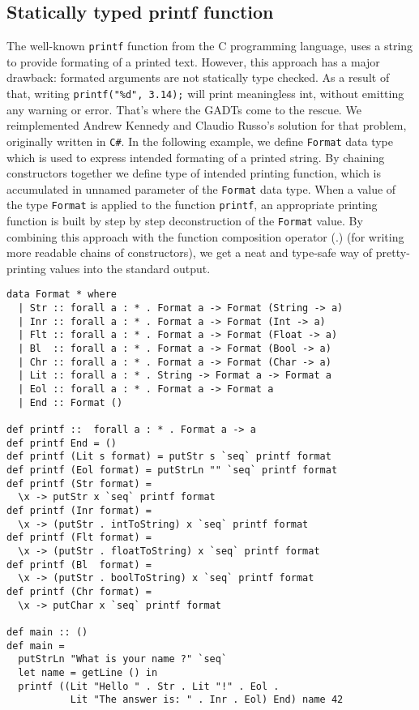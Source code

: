 \documentclass[declaration,shortabstract,english]{iithesis}
\begin{document}
\subsection*{Statically typed printf function}
The well-known \verb+printf+ function from the C programming language,
uses a string to provide formating of a printed text. However, this approach
has a major drawback: formated arguments are not statically type checked.
As a result of that, writing \verb+printf("%d", 3.14);+ will print meaningless int,
without emitting any warning or error. That's where the GADTs come to the rescue.
We reimplemented Andrew Kennedy and Claudio Russo's\cite{gadt-oop} solution for that problem, originally written in \verb+C#+.
In the following example, we define \verb+Format+ data type which is used to express intended formating of a
printed string. By chaining constructors together we define type of intended printing function,
which is accumulated in unnamed parameter of the \verb+Format+ data type. When a value of
the type \verb+Format+ is applied to the function \verb+printf+, an appropriate printing function
is built by step by step deconstruction of the \verb+Format+ value. By combining this approach
with the function composition operator (.) (for writing more readable chains of constructors),
we get a neat and type-safe way of pretty-printing values into the standard output.
\begin{verbatim}
data Format * where
  | Str :: forall a : * . Format a -> Format (String -> a)
  | Inr :: forall a : * . Format a -> Format (Int -> a)
  | Flt :: forall a : * . Format a -> Format (Float -> a)
  | Bl  :: forall a : * . Format a -> Format (Bool -> a)
  | Chr :: forall a : * . Format a -> Format (Char -> a)
  | Lit :: forall a : * . String -> Format a -> Format a
  | Eol :: forall a : * . Format a -> Format a
  | End :: Format ()

def printf ::  forall a : * . Format a -> a
def printf End = ()
def printf (Lit s format) = putStr s `seq` printf format
def printf (Eol format) = putStrLn "" `seq` printf format
def printf (Str format) =
  \x -> putStr x `seq` printf format
def printf (Inr format) =
  \x -> (putStr . intToString) x `seq` printf format
def printf (Flt format) =
  \x -> (putStr . floatToString) x `seq` printf format
def printf (Bl  format) =
  \x -> (putStr . boolToString) x `seq` printf format
def printf (Chr format) =
  \x -> putChar x `seq` printf format

def main :: ()
def main =
  putStrLn "What is your name ?" `seq`
  let name = getLine () in
  printf ((Lit "Hello " . Str . Lit "!" . Eol .
           Lit "The answer is: " . Inr . Eol) End) name 42
\end{verbatim}
\end{document}

